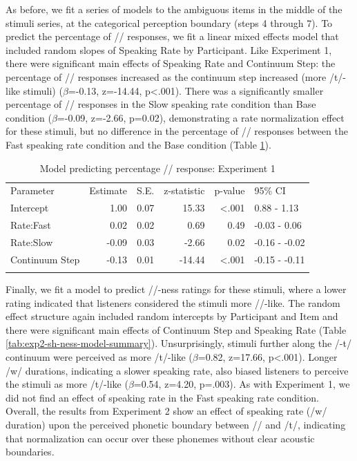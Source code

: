 As before, we fit a series of models to the ambiguous items in the middle of the stimuli series, at the categorical perception boundary (steps 4 through 7). To predict the percentage of /\textesh/ responses, we fit a linear mixed effects model that included random slopes of Speaking Rate by Participant. Like Experiment 1, there were significant main effects of Speaking Rate and Continuum Step: the percentage of /\textesh/ responses increased as the continuum step increased (more /t\textesh/-like stimuli) (\(\beta\)=-0.13, z=-14.44, p\textless.001). There was a significantly smaller percentage of /\textesh/ responses in the Slow speaking rate condition than Base condition (\(\beta\)=-0.09, z=-2.66, p=0.02), demonstrating a rate normalization effect for these stimuli, but no difference in the percentage of /\textesh/ responses between the Fast speaking rate condition and the Base condition (Table \ref{tab:exp2-sh-percen-model-summary}).

\begin{table}
\caption{\label{tab:exp2-sh-percen-model-summary}Model predicting percentage /\textesh/ response: Experiment 1}
\centering
\begin{tabular}[t]{lrrrrl}
\hline\noalign{\smallskip}
Parameter & Estimate & S.E. & z-statistic & p-value & 95\% CI\\
\noalign{\smallskip}\hline\noalign{\smallskip}
Intercept & 1.00 & 0.07 & 15.33 & <.001 & 0.88 - 1.13\\
Rate:Fast & 0.02 & 0.02 & 0.69 & 0.49 & -0.03 - 0.06\\
Rate:Slow & -0.09 & 0.03 & -2.66 & 0.02 & -0.16 - -0.02\\
Continuum Step & -0.13 & 0.01 & -14.44 & <.001 & -0.15 - -0.11\\
\noalign{\smallskip}\hline
\end{tabular}
\end{table}


Finally, we fit a model to predict /\textesh/-ness ratings for these stimuli, where a lower rating indicated that listeners considered the stimuli more /\textesh/-like. The random effect structure again included random intercepts by Participant and Item and there were significant main effects of Continuum Step and Speaking Rate (Table \ref{tab:exp2-sh-ness-model-summary}). Unsurprisingly, stimuli further along the /\textesh-t\textesh/ continuum were perceived as more /t\textesh/-like (\(\beta\)=0.82, z=17.66, p\textless.001). Longer /w/ durations, indicating a slower speaking rate, also biased listeners to perceive the stimuli as more /t\textesh/-like (\(\beta\)=0.54, z=4.20, p=.003). As with Experiment 1, we did not find an effect of speaking rate in the Fast speaking rate condition. Overall, the results from Experiment 2 show an effect of speaking rate (/w/ duration) upon the perceived phonetic boundary between /\textesh/ and /t\textesh/, indicating that normalization can occur over these phonemes without clear acoustic boundaries.

